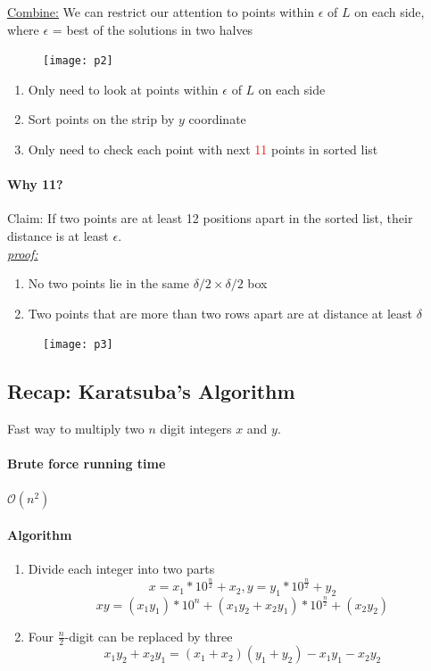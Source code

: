 \documentclass[11pt]{article}
\newcommand{\under}[1]{\underline{#1}}
\newcommand{\proof}[0]{\textit{\underline{proof:} }}
\begin{document}
\under{Combine:} We can restrict our attention to points within $\epsilon$ of $L$ on each side, where $\epsilon$ = best of the solutions in two halves

\begin{figure}[h]
	\centering
	\texttt{[image: p2]}
\end{figure}

\begin{enumerate}
	\item Only need to look at points within $\epsilon$ of $L$ on each side
	\item Sort points on the strip by $y$ coordinate
	\item Only need to check each point with next \textcolor{red}{11} points in sorted list
\end{enumerate}
\paragraph{Why 11?}
Claim: If two points are at least 12 positions apart in the sorted list, their distance is at least $\epsilon$. \\
\proof \\
\begin{enumerate}
	\item No two points lie in the same $\delta / 2 \times \delta / 2$ box
	\item Two points that are more than two rows apart are at distance at least $\delta$
\end{enumerate}

\begin{figure}[h]
	\centering
	\texttt{[image: p3]}
\end{figure}

\subsection{Recap: Karatsuba's Algorithm}
Fast way to multiply two $n$ digit integers $x$ and $y$.
\paragraph{Brute force running time}
$\mathcal{O}(n^2)$

\paragraph{Algorithm}
\begin{enumerate}
	\item Divide each integer into two parts
	$$ x = x_1 * 10^{\frac{n}{2}} + x_2, y = y_1 * 10^{\frac{n}{2}} + y_2$$
	$$ xy = (x_1y_1) * 10^n + (x_1y_2 + x_2y_1) * 10^{\frac{n}{2}} + (x_2y_2)$$
	\item Four $\frac{n}{2}$-digit can be replaced by three
	$$x_1y_2 + x_2y_1 = (x_1 + x_2)(y_1 + y_2) - x_1y_1 - x_2y_2$$
\end{enumerate}
\end{document}
